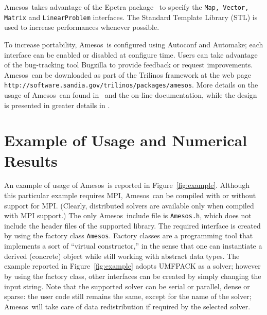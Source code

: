 \documentclass{llncs}
\newcommand{\amesos}{{\sc Amesos}}
\begin{document}
\amesos\ takes advantage of the {\sc Epetra} package~\cite{Epetra-Ref-Guide}
to specify the {\tt Map, Vector, Matrix} and {\tt LinearProblem} interfaces.
The Standard Template Library (STL) is used to increase performances
whenever possible.

To increase portability, \amesos\ is configured using
Autoconf and Automake; each
interface can be enabled or disabled at configure time. Users can
take advantage of the bug-tracking tool Bugzilla to
provide feedback or request improvements. \amesos\ can be downloaded as part of
the Trilinos framework at the web
page
\verb!http://software.sandia.gov/trilinos/packages/amesos!. More details on
the usage of \amesos\ can found in~\cite{Amesos-Reference-Guide} and the
on-line documentation, while the
design is presented in greater details in \cite{sala06design}.

\section{Example of Usage and Numerical Results}
\label{sec:numerical}

An example of usage of \amesos\ is reported in Figure~\ref{fig:example}.
Although this particular example requires MPI, \amesos\ can be compiled with
or without support for MPI.  (Clearly, distributed solvers are available only
when compiled with MPI support.) The only \amesos\ include file is
\verb!Amesos.h!, which does not include the header files of the supported
library.  The required interface is created by using the factory class \verb!Amesos!.
Factory classes are a programming tool that implements a sort of ``virtual
constructor,'' in the sense that one can instantiate a derived (concrete)
object while still working with abstract data types. The example reported in
Figure~\ref{fig:example} adopts UMFPACK as a solver; however by using the
factory class, other interfaces can be created by simply changing the
input string. Note that the supported solver can be serial or
parallel, dense or sparse: the user code still remains the same, except for
the name of the solver; \amesos\ will take care of data redistribution if
required by the selected solver.
\end{document}
